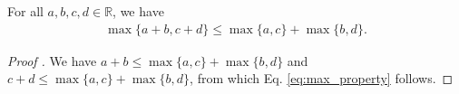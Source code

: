 \begin{theorem}\label{thrm:max_property}
	For all $a, b, c, d\in\mathbb R$, we have 
	\begin{align}\label{eq:max_property}
		\max\{a + b, c + d\} \leq \max\{a, c\} + \max\{b, d\}.
	\end{align}
\end{theorem}

\begin{proof}[Proof \cite{1975962}]
	We have $a + b \leq \max\{a, c\} + \max\{b, d\}$ and $c + d \leq \max\{a, c\} + \max\{b, d\}$, from which Eq. \eqref{eq:max_property} follows.
\end{proof}